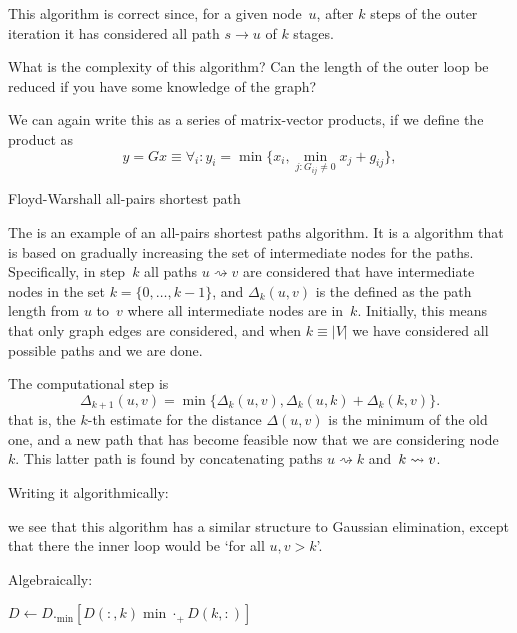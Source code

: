This algorithm is correct since, for a given node~$u$, after $k$ steps of the outer iteration
it has considered all path $s\rightarrow u$ of $k$ stages.

\begin{exercise}
  What is the complexity of this algorithm? Can the length of the
  outer loop be reduced if you have some knowledge of the graph?
\end{exercise}

We can again write this as a series of matrix-vector products, if we define
the product as
\[ y=Gx\equiv \forall_i\colon
  y_i = \min\bigl\{ x_i, \min_{j\colon G_{ij}\not=0} x_j+g_{ij} \bigr\},
\]

 {Floyd-Warshall all-pairs shortest path}
\label{sec:floyd}

The  is an example of an all-pairs
shortest paths algorithm. It is a 
algorithm that is based on gradually increasing the set of intermediate
nodes for the paths.
Specifically,  in step~$k$ all paths $u\rightsquigarrow v$ are considered 
that have intermediate nodes in the set $k=\{0,\ldots,k-1\}$, and $\Delta_k(u,v)$ 
is the defined as the path length from $u$ to~$v$ where all intermediate nodes
are in~$k$. Initially, this means that only graph edges are considered, and
when $k\equiv |V|$ we have considered all possible paths and we are done.

The computational step is
\[
    \Delta_{k+1}(u,v) = \min\bigl\{ \Delta_k(u,v),
    \Delta_k(u,k)+\Delta_k(k,v) \bigr\}.
\]
that is, the $k$-th estimate for the distance $\Delta(u,v)$ is the minimum
of the old one, and a new path that has become feasible now that we
are considering node~$k$. This latter path is found by
concatenating paths $u\rightsquigarrow k$
and~$k\rightsquigarrow\nobreak v$.

Writing it algorithmically:
\begin{displayalgorithm}
\end{displayalgorithm}
we see that this algorithm has a similar structure to Gaussian elimination, 
except that there the inner loop would be `for all $u,v>k$'.

Algebraically:
\begin{displayalgorithm}
   {
    $D\leftarrow D._{\min} [D(:,k) \mathbin{\min\cdot_+} D(k,:) ]$
  }
\end{displayalgorithm}

